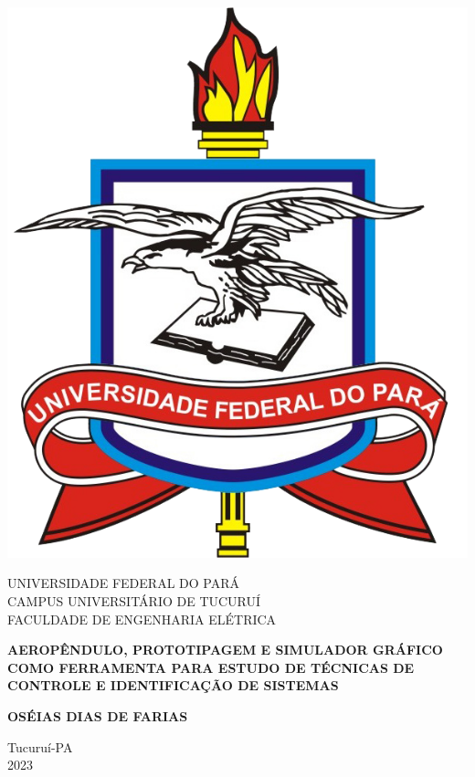 	\thispagestyle{empty}
	\begin{center}

        \includegraphics[scale=0.5]{Figuras/logoufpa.png}
		
			UNIVERSIDADE FEDERAL DO PARÁ\\
			CAMPUS UNIVERSITÁRIO DE TUCURUÍ\\
			FACULDADE DE ENGENHARIA ELÉTRICA
			
			\vfill 
			
			\textbf{AEROPÊNDULO, PROTOTIPAGEM E SIMULADOR GRÁFICO COMO FERRAMENTA PARA ESTUDO DE TÉCNICAS DE CONTROLE E IDENTIFICAÇÃO DE SISTEMAS}
			
			\vfill
			
			\textbf{OSÉIAS DIAS DE FARIAS}
			
			\vfill \vfill
			
			Tucuruí-PA\\			
			2023
			
	\end{center}

